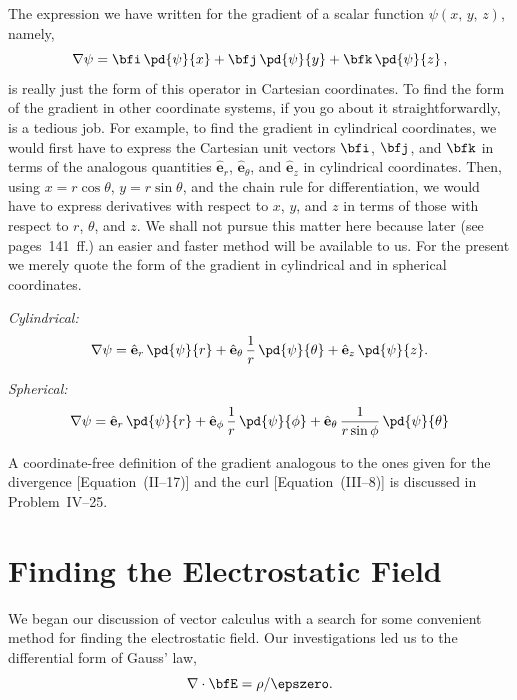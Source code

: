 The expression we have written for the gradient of a scalar
function $\psi(x,\,y,\,z)$, namely,
\[
\nabla\psi = \bfi\,\pd{\psi}{x} + \bfj\,\pd{\psi}{y}
            + \bfk\,\pd{\psi}{z}\,,
\]
is really just the form of this operator in Cartesian coordinates.
To find the form of the gradient in other coordinate systems, if you
go about it straightforwardly, is a tedious job.  For example, to
find the gradient in cylindrical coordinates, we would first have to
express the Cartesian unit vectors $\bfi$, $\bfj$, and $\bfk$ in terms
of the analogous quantities $\hat{\mathbf{e}}_r$,
$\hat{\mathbf{e}}_\theta$, and $\hat{\mathbf{e}}_z$ in cylindrical
coordinates.  Then, using $x = r\cos\theta$, $y = r\sin\theta$, and
the chain rule for differentiation, we would have to express
derivatives with respect to $x$, $y$, and $z$ in terms of those with
respect to $r$, $\theta$, and $z$.  We shall not pursue this matter
here because later (see pages~141~ff.) an easier and faster method
will be available to us.  For the present we merely quote the form of
the gradient in cylindrical and in spherical coordinates.

\emph{Cylindrical:}
\begin{equation}
\nabla\psi
= \hat{\mathbf{e}}_r\,\pd{\psi}{r}
+ \hat{\mathbf{e}}_\theta\,\frac{1}{r}\,\pd{\psi}{\theta}
+ \hat{\mathbf{e}}_z\,\pd{\psi}{z}.
\label{eq:IV-3}
\end{equation}

\emph{Spherical:}
\begin{equation}
\nabla\psi
= \hat{\mathbf{e}}_r\,\pd{\psi}{r}
+ \hat{\mathbf{e}}_\phi\,\frac{1}{r}\,\pd{\psi}{\phi}
+ \hat{\mathbf{e}}_\theta\,\frac{1}{r\sin\phi}\,\pd{\psi}{\theta}
\label{eq:IV-4}
\end{equation}

A coordinate-free definition of the gradient analogous to the ones
given for the divergence [Equation~(II--17)] and the curl
[Equation~(III--8)] is discussed in Problem~IV--25.


\section{Finding the Electrostatic Field}

We began our discussion of vector calculus with a search for some
convenient method for finding the electrostatic field.  Our
investigations led us to the differential form of Gauss' law,
\[
\nabla\cdot\bfE = \rho/\epszero.
\]

